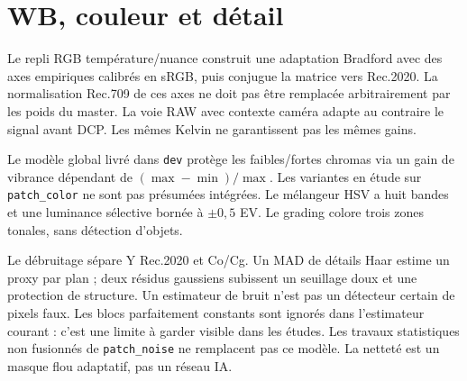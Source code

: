 \section{WB, couleur et détail}
Le repli RGB température/nuance construit une adaptation Bradford avec des
axes empiriques calibrés en sRGB, puis conjugue la matrice vers Rec.2020.
La normalisation Rec.709 de ces axes ne doit pas être remplacée arbitrairement
par les poids du master. La voie RAW avec contexte caméra adapte au contraire
le signal avant DCP. Les mêmes Kelvin ne garantissent pas les mêmes gains.

Le modèle global livré dans \texttt{dev} protège les faibles/fortes chromas
via un gain de vibrance dépendant de $(\max-\min)/\max$. Les variantes en
étude sur \texttt{patch\_color} ne sont pas présumées intégrées. Le mélangeur
HSV a huit bandes et une luminance sélective bornée à $\pm0{,}5$ EV.
Le grading colore trois zones tonales, sans détection d'objets.

Le débruitage sépare Y Rec.2020 et Co/Cg. Un MAD de détails Haar estime un
proxy par plan ; deux résidus gaussiens subissent un seuillage doux et une
protection de structure. Un estimateur de bruit n'est pas un détecteur
certain de pixels faux. Les blocs parfaitement constants sont ignorés
dans l'estimateur courant : c'est une limite à garder visible dans les études.
Les travaux statistiques non fusionnés de \texttt{patch\_noise} ne remplacent
pas ce modèle. La netteté est un masque flou adaptatif, pas un réseau IA.

